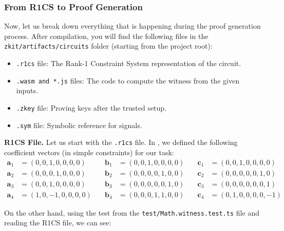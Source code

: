 \documentclass[../lecture-notes.tex]{subfiles}
\begin{document}
    \subsubsection{From R1CS to Proof Generation}

    Now, let us break down everything that is happening during the proof
    generation process. After compilation, you will find the following files in
    the \texttt{zkit/artifacts/circuits} folder (starting from the project
    root):
    \begin{itemize}
        \item \texttt{.r1cs} file: The Rank-1 Constraint System representation of the circuit.
        \item \texttt{.wasm and *.js} files: The code to compute the witness from the given inputs.
        \item \texttt{.zkey} file: Proving keys after the trusted setup.
        \item \texttt{.sym} file: Symbolic reference for signals.
    \end{itemize}

    \textbf{R1CS File.} Let us start with the \texttt{.r1cs} file. In ,
    we defined the following coefficient vectors (in simple constraints) for our
    task:
    \begin{align*}
        \mathbf{a}_1 &= (0, 0, 1, 0, 0, 0, 0) & \quad \mathbf{b}_1 &= (0, 0, 1, 0, 0, 0, 0) & \quad \mathbf{c}_1 &= (0, 0, 1, 0, 0, 0, 0) \\
        \mathbf{a}_2 &= (0, 0, 0, 1, 0, 0, 0) & \quad \mathbf{b}_2 &= (0, 0, 0, 0, 1, 0, 0) & \quad \mathbf{c}_2 &= (0, 0, 0, 0, 0, 1, 0) \\
        \mathbf{a}_3 &= (0, 0, 1, 0, 0, 0, 0) & \quad \mathbf{b}_3 &= (0, 0, 0, 0, 0, 1, 0) & \quad \mathbf{c}_3 &= (0, 0, 0, 0, 0, 0, 1) \\
        \mathbf{a}_4 &= (1, 0, -1, 0, 0, 0, 0) & \quad \mathbf{b}_4 &= (0, 0, 0, 1, 1, 0, 0) & \quad \mathbf{c}_4 &= (0, 1, 0, 0, 0, 0, -1)
    \end{align*}

    On the other hand, using the test from the \texttt{test/Math.witness.test.ts} file and reading the R1CS file, we can see:
\end{document}
